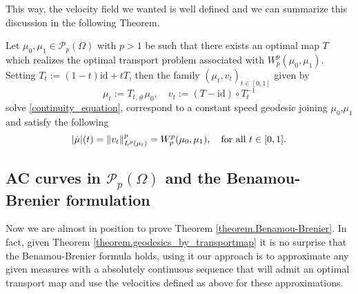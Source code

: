 This way, the velocity field we wanted is well defined and we can summarize this discussion in the following Theorem.
\begin{theorem}
	\label{theorem.geodesics_by_transportmap}
	Let $\mu_0, \mu_1 \in \mathcal{P}_p(\Omega)$ with $p> 1$ be such that there exists an optimal map $T$ which realizes the optimal transport problem associated with $W_p^p(\mu_0, \mu_1)$. Setting $T_t:= (1-t)\text{id} + tT$, then the family $(\mu_t, v_t)_{t \in [0,1]}$ given by 
	\begin{equation}
	\mu_t:= T_{t, \#}\mu_0, \quad v_t := (T - \text{id})\circ T_t^{-1}
	\end{equation}
	solve \eqref{continuity_equation}, correspond to a constant speed geodesic joining $\mu_0$,$\mu_1$ and satisfy the following
	\begin{equation}
	|\dot{\mu}|(t) = \norm{v_t}^p_{L^p(\mu_t)} = W_p^p(\mu_0, \mu_1), \quad \text{for all $t \in [0,1]$.}
	\end{equation} 
\end{theorem} 

\subsection{AC curves in $\mathcal{P}_p(\Omega)$ and the Benamou-Brenier formulation}

Now we are almost in position to prove Theorem \ref{theorem.Benamou-Brenier}. In fact, given Theorem \ref{theorem.geodesics_by_transportmap} it is no surprise that the Benamou-Brenier formula holds, using it our approach is to approximate any given measures with a absolutely continuous sequence that will admit an optimal transport map and use the velocities defined as above for these approximations. 

